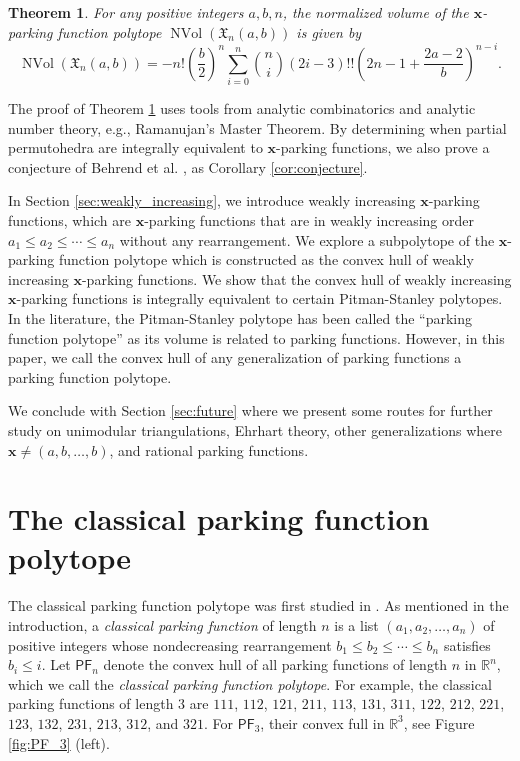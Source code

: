 \documentclass[11pt]{amsart}
\newtheorem{theorem}{Theorem}[section]
\theoremstyle{definition}
\newcommand{\0}{\emptyset}
\newcommand{\R}{\mathbb{R}}
\newcommand{\bx}{\mathbf{x}}
\newcommand{\PF}{\mathsf{PF}}
\DeclareMathOperator{\nVol}{NVol}
\begin{document}
\begin{theorem}\label{thm:generalized_closed_form_volume}
For any positive integers $a,b,n$, the normalized volume of the $\bx$-parking function polytope $\nVol(\mathfrak{X}_{n}(a,b))$ is given by
\begin{equation}
    \nVol(\mathfrak{X}_{n}(a,b)) = -n!\left(\frac{b}{2}\right)^n \sum_{i=0}^n \binom{n}{i} (2i-3)!! \left(2n-1 + \frac{2a-2}{b}\right)^{n-i}. \nonumber
\end{equation}
\end{theorem}
\noindent The proof of Theorem \ref{thm:generalized_closed_form_volume} uses tools from analytic combinatorics and analytic number theory, e.g., Ramanujan's Master Theorem.  
By determining when partial permutohedra are integrally equivalent to $\mathbf{x}$-parking functions, we also prove a conjecture of Behrend et al. \cite{BCC}, as Corollary \ref{cor:conjecture}.


In Section \ref{sec:weakly_increasing}, we introduce weakly increasing $\mathbf{x}$-parking functions, which are $\mathbf{x}$-parking functions that are in weakly increasing order $a_1 \leq a_2 \leq \cdots \leq a_n$ without any rearrangement. 
We explore a subpolytope of the $\mathbf{x}$-parking function polytope which is constructed as the convex hull of weakly increasing $\mathbf{x}$-parking functions. 
We show that the convex hull of weakly increasing $\mathbf{x}$-parking functions is integrally equivalent to certain Pitman-Stanley polytopes. 
In the literature, the Pitman-Stanley polytope has been called the ``parking function polytope'' as its volume is related to parking functions.
However, in this paper, we call the convex hull of any generalization of parking functions a parking function polytope.

We conclude with Section \ref{sec:future} where we present some routes for further study on unimodular triangulations, Ehrhart theory, other generalizations where $\mathbf{x} \neq (a, b, \ldots, b)$, and rational parking functions.




\section{The classical parking function polytope}\label{sec:classical}
The classical parking function polytope was first studied in \cite{AW, Sto}. As mentioned in the introduction, a \textit{classical parking function} of length $n$ is a list $(a_1, a_2, \ldots, a_n)$ of positive integers whose nondecreasing rearrangement $b_1 \leq b_2 \leq \cdots \leq b_n$ satisfies $b_i \leq i$. 
Let $\PF_n$ denote the convex hull of all parking functions of length $n$ in $\R^n$, which we call the \textit{classical parking function polytope}.
For example, the classical parking functions of length $3$ are $111$, $112$, $121$, $211$, $113$, $131$, $311$, $122$, $212$, $221$, $123$, $132$, $231$, $213$, $312$, and $321$.
For $\PF_3$, their convex full in $\R^3$, see Figure \ref{fig:PF_3} (left).
\end{document}
